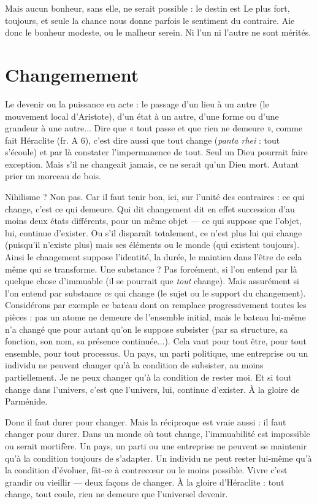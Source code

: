 Mais aucun bonheur, sans elle, ne serait possible : le destin est Le plus fort,
toujours, et seule la chance nous donne parfois le sentiment du contraire. Aie
donc le bonheur modeste, ou le malheur serein. Ni l’un ni l’autre ne sont
mérités.

\section{Changemement}
Le devenir ou la puissance en acte : le passage d’un lieu à
un autre (le mouvement local d’Aristote), d’un état à un
autre, d’une forme ou d’une grandeur à une autre... Dire que « tout passe et
que rien ne demeure », comme fait Héraclite (fr. A 6), c’est dire aussi que tout
change ({\it panta rhei} : tout s’écoule) et par là constater l’impermanence de tout.
Seul un Dieu pourrait faire exception. Mais s’il ne changeait jamais, ce ne serait
qu’un Dieu mort. Autant prier un morceau de bois.

Nihilisme ? Non pas. Car il faut tenir bon, ici, sur l’unité des contraires : ce
qui change, c’est ce qui demeure. Qui dit changement dit en effet succession
d’au moins deux états différents, pour un même objet — ce qui suppose que
l’objet, lui, continue d’exister. Ou s’il disparaît totalement, ce n’est plus lui qui
change (puisqu'il n’existe plus) mais ses éléments ou le monde (qui existent
toujours). Ainsi le changement suppose l'identité, la durée, le maintien dans
l’être de cela même qui se transforme. Une substance ? Pas forcément, si l’on
entend par là quelque chose d’immuable (il se pourrait que {\it tout} change). Mais
assurément si l’on entend par substance {\it ce} qui change (le sujet ou le support du
changement). Considérons par exemple ce bateau dont on remplace progressivement
toutes les pièces : pas un atome ne demeure de l’ensemble initial, mais
le bateau lui-même n’a changé que pour autant qu’on le suppose subsister (par
sa structure, sa fonction, son nom, sa présence continuée...). Cela vaut pour
tout être, pour tout ensemble, pour tout processus. Un pays, un parti politique,
une entreprise ou un individu ne peuvent changer qu’à la condition de subsister,
au moins partiellement. Je ne peux changer qu’à la condition de rester
moi. Et si tout change dans l’univers, c’est que l’univers, lui, continue d’exister.
À la gloire de Parménide.

Donc il faut durer pour changer. Mais la réciproque est vraie aussi : il faut
changer pour durer. Dans un monde où tout change, l’immuabilité est impossible
ou serait mortifère. Un pays, un parti ou une entreprise ne peuvent se
maintenir qu’à la condition toujours de s’adapter. Un individu ne peut rester
lui-même qu’à la condition d’évoluer, fât-ce à contrecœur ou le moins possible.
Vivre c’est grandir ou vieillir — deux façons de changer. À la gloire
d’Héraclite : tout change, tout coule, rien ne demeure que l’universel devenir.

